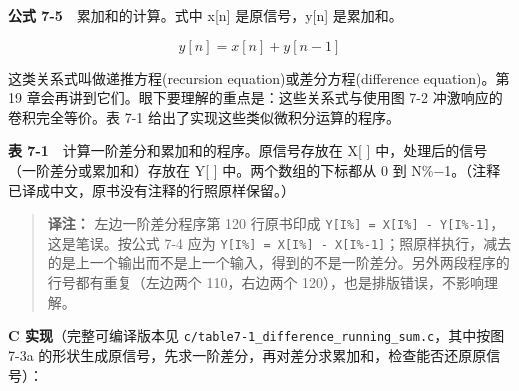 \textbf{公式 7-5}　累加和的计算。式中 x{[}n{]} 是原信号，y{[}n{]}
是累加和。

\[y[n] = x[n] + y[n-1]\]

这类关系式叫做递推方程(recursion equation)或差分方程(difference
equation)。第 19 章会再讲到它们。眼下要理解的重点是：这些关系式与使用图
7-2 冲激响应的卷积完全等价。表 7-1 给出了实现这些类似微积分运算的程序。

\textbf{表 7-1}　计算一阶差分和累加和的程序。原信号存放在 X{[} {]}
中，处理后的信号（一阶差分或累加和）存放在 Y{[} {]}
中。两个数组的下标都从 0 到
N\%−1。（注释已译成中文，原书没有注释的行照原样保留。）

\begin{Shaded}
\begin{Highlighting}[]
\end{Highlighting}
\end{Shaded}

\begin{quote}
\textbf{译注：} 左边一阶差分程序第 120 行原书印成
\texttt{Y{[}I\%{]}\ =\ X{[}I\%{]}\ -\ Y{[}I\%-1{]}}，这是笔误。按公式
7-4 应为
\texttt{Y{[}I\%{]}\ =\ X{[}I\%{]}\ -\ X{[}I\%-1{]}}；照原样执行，减去的是上一个输出而不是上一个输入，得到的不是一阶差分。另外两段程序的行号都有重复（左边两个
110，右边两个 120），也是排版错误，不影响理解。
\end{quote}

\textbf{C 实现}（完整可编译版本见
\texttt{c/table7-1\_difference\_running\_sum.c}，其中按图 7-3a
的形状生成原信号，先求一阶差分，再对差分求累加和，检查能否还原原信号）：

